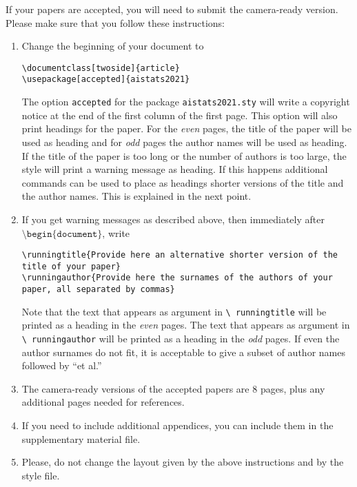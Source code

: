 \documentclass[twoside]{article}
\begin{document}
If your papers are accepted, you will need to submit the camera-ready version. Please make sure that you follow these instructions:
\begin{enumerate}
    \item Change the beginning of your document to
    \begin{flushleft}
    \texttt{\textbackslash documentclass[twoside]\{article\}}\\
    \texttt{\textbackslash usepackage[accepted]\{aistats2021\}}
    \end{flushleft}
    The option \texttt{accepted} for the package
    \texttt{aistats2021.sty} will write a copyright notice at the end of
    the first column of the first page. This option will also print
    headings for the paper.  For the \emph{even} pages, the title of
    the paper will be used as heading and for \emph{odd} pages the
    author names will be used as heading.  If the title of the paper
    is too long or the number of authors is too large, the style will
    print a warning message as heading. If this happens additional
    commands can be used to place as headings shorter versions of the
    title and the author names. This is explained in the next point.
    \item  If you get warning messages as described above, then
    immediately after $\texttt{\textbackslash
    begin\{document\}}$, write
    \begin{flushleft}
    \texttt{\textbackslash runningtitle\{Provide here an alternative
    shorter version of the title of your paper\}}\\
    \texttt{\textbackslash runningauthor\{Provide here the surnames of
    the authors of your paper, all separated by commas\}}
    \end{flushleft}
    Note that the text that appears as argument in \texttt{\textbackslash
      runningtitle} will be printed as a heading in the \emph{even}
    pages. The text that appears as argument in \texttt{\textbackslash
      runningauthor} will be printed as a heading in the \emph{odd}
    pages.  If even the author surnames do not fit, it is acceptable
    to give a subset of author names followed by ``et al.''


    \item The camera-ready versions of the accepted papers are 8
      pages, plus any additional pages needed for references.

    \item If you need to include additional appendices,
      you can include them in the supplementary
      material file.

    \item Please, do not change the layout given by the above
      instructions and by the style file.

\end{enumerate}
\end{document}
